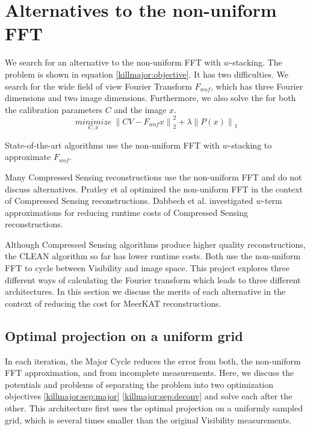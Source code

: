 \section{Alternatives to the non-uniform FFT}\label{killmajor}

We search for an alternative to the non-uniform FFT with $w$-stacking. The problem is shown in equation \eqref{killmajor:objective}. It has two difficulties. We search for the wide field of view Fourier Transform $F_{wof}$, which has three Fourier dimensions and two image dimensions. Furthermore, we also solve the for both the calibration parameters $C$ and the image $x$.
\begin{equation}\label{killmajor:objective}
\underset{C, x}{minimize} \: \left \| CV - F_{wof}x \right \|_2^2 + \lambda \left \| P(x) \right \|_1
\end{equation}

State-of-the-art algorithms use the non-uniform FFT with $w$-stacking to approximate $F_{wof}$. 


Many Compressed Sensing reconstructions use the non-uniform FFT\cite{girard2015sparse, dabbech2018cygnus, mcewen2011compressed, pratley2018fast}  and do not discuss alternatives. Pratley et al\cite{pratley2017robust} optimized the non-uniform FFT in the context of Compressed Sensing reconstructions. Dabbech et al.\cite{dabbech2017wEffect} investigated $w$-term approximations for reducing runtime costs of Compressed Sensing reconstructions.

Although Compressed Sensing algorithms produce higher quality reconstructions, the CLEAN algorithm so far has lower runtime costs. Both use the non-uniform FFT to cycle between Visibility and image space. This project explores three different ways of calculating the Fourier transform which leads to three different architectures. In this section we discuss the merits of each alternative in the context of reducing the cost for MeerKAT reconstructions.

\subsection{Optimal projection on a uniform grid}
In each iteration, the Major Cycle reduces the error from both, the non-uniform FFT approximation, and from incomplete measurements. Here, we discuss the potentials and problems of separating the problem into two optimization objectives \eqref{killmajor:sep:major} \eqref{killmajor:sep:deconv} and solve each after the other. This architecture first uses the optimal projection on a uniformly sampled grid, which is several times smaller than the original Visibility measurements.


